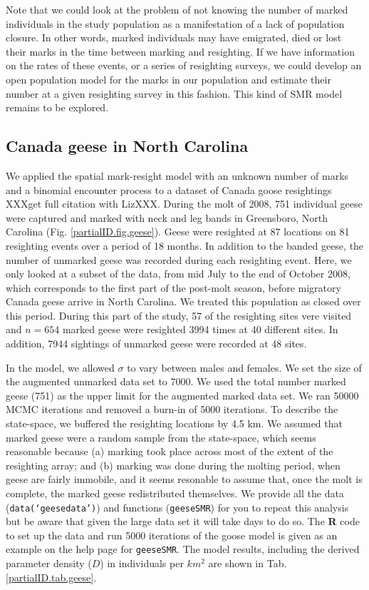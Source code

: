 Note that we could look at the problem of not knowing the number of marked individuals in the study population as a manifestation of a lack of population closure. In other words, marked individuals may have emigrated, died or lost their marks in the time between marking and resighting. If we have information on the rates of these events, or a series of resighting surveys, we could develop an open population model for the marks in our population and estimate their number at a given resighting survey in this fashion. This kind of SMR model remains to be explored.

\subsection{Canada geese in North Carolina}

We applied the spatial mark-resight model with an unknown number of
marks and a binomial encounter process to a dataset of Canada goose
resightings \citep{rutledge:2012} XXXget full citation with
LizXXX. During the molt of 2008, 751 individual geese were captured
and marked with neck and leg bands in Greensboro, North Carolina
(Fig. \ref{partialID.fig.geese}). Geese were resighted at 87
locations
on 81 resighting events over a period of 18 months. In addition to the
banded geese, the number of unmarked geese was recorded during each
resighting event. Here, we only looked at a subset of the data, from
mid July to the end of October 2008, which corresponds to the first
part of the post-molt season, before migratory Canada geese arrive in
North Carolina. We treated this population as closed over this period.
During this part of the study, 57 of the resighting sites vere visited and $n = 654$ marked geese were resighted 3994 times at 40 different sites. In addition, 7944 sightings of unmarked geese were recorded at 48 sites.

In the model, we allowed $\sigma$ to vary between males and
females. We set the size of the augmented unmarked data set to 7000. We used the total number marked geese (751) as the upper limit for the augmented marked data set. We ran 50000 MCMC iterations and removed a burn-in of 5000 iterations. To describe the state-space, we buffered the resighting locations by 4.5 km. We assumed that marked geese were a random sample from the state-space, which seems reasonable because (a) marking took place across most of the extent of the resighting array; and (b) marking was done during the molting period, when geese are fairly immobile, and it seems resonable to assume that, once the molt is complete, the marked geese redistributed themselves. We provide all the data ({\tt data(`geesedata')}) and functions ({\tt geeseSMR}) for you to repeat this analysis but be aware that given the large data set it will take days to do so. The {\bf R} code to set up the data and run 5000 iterations of the goose model is given as an example on the help page for {\tt geeseSMR}. The model results, including the derived parameter density ($D$) in individuals per $km^2$ are shown in Tab. \ref{partialID.tab.geese}.


